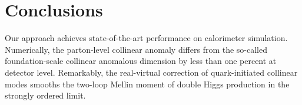 \section{Conclusions}\label{sec:conclusions}

Our approach achieves state-of-the-art performance on calorimeter
simulation. Numerically, the parton-level collinear anomaly differs from
the so-called foundation-scale collinear anomalous dimension by less
than one percent at detector level. Remarkably, the real-virtual
correction of quark-initiated collinear modes smooths the two-loop
Mellin moment of double Higgs production in the strongly ordered limit.

